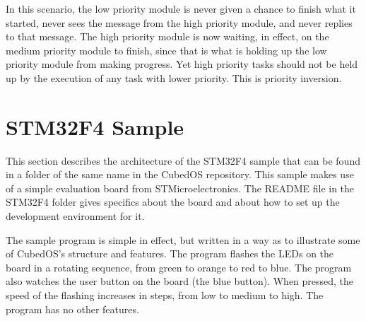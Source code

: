 In this scenario, the low priority module is never given a chance to finish what it started,
never sees the message from the high priority module, and never replies to that message. The
high priority module is now waiting, in effect, on the medium priority module to finish, since
that is what is holding up the low priority module from making progress. Yet high priority tasks
should not be held up by the execution of any task with lower priority. This is priority
inversion.



\section{STM32F4 Sample}
\label{sec:stm32f4-sample}

This section describes the architecture of the STM32F4 sample that can be found in a folder of
the same name in the CubedOS repository. This sample makes use of a simple evaluation board from
STMicroelectronics. The README file in the STM32F4 folder gives specifics about the board and
about how to set up the development environment for it.

The sample program is simple in effect, but written in a way as to illustrate some of CubedOS's
structure and features. The program flashes the LEDs on the board in a rotating sequence, from
green to orange to red to blue. The program also watches the user button on the board (the blue
button). When pressed, the speed of the flashing increases in steps, from low to medium to high.
The program has no other features.

